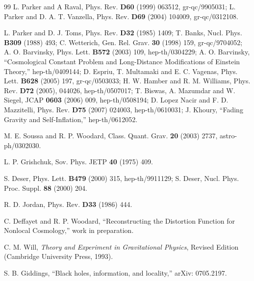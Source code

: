 \documentclass[12pt]{article}
\begin{document}
\begin{thebibliography}{99}
 L. Parker and A Raval, Phys. Rev. {\bf D60} (1999) 063512,
gr-qc/9905031; L. Parker and D. A. T. Vanzella, Phys. Rev. {\bf D69} (2004)
104009, gr-qc/0312108.

 L. Parker and D. J. Toms, Phys. Rev. {\bf D32} (1985) 1409;
T. Banks, Nucl. Phys. {\bf B309} (1988) 493;
C. Wetterich, Gen. Rel. Grav. {\bf 30} (1998) 159, gr-qc/9704052;
A. O. Barvinsky, Phys. Lett. {\bf B572} (2003) 109, hep-th/0304229;
A. O. Barvinsky, ``Cosmological Constant Problem and Long-Distance 
Modifications of Einstein Theory,'' hep-th/0409144;
D. Espriu, T. Multamaki and E. C. Vagenas, Phys. Lett. {\bf
B628} (2005) 197, gr-qc/0503033;
H. W. Hamber and R. M. Williams, Phys. Rev. {\bf D72} (2005),
044026, hep-th/0507017;
T. Biswas, A. Mazumdar and W. Siegel, JCAP {\bf 0603}
(2006) 009, hep-th/0508194;
D. Lopez Nacir and F. D. Mazzitelli, Phys. Rev. {\bf D75} (2007) 024003,
hep-th/0610031;
J. Khoury, ``Fading Gravity and Self-Inflation,''
hep-th/0612052.

 M. E. Soussa and R. P. Woodard, Class. Quant. Grav. {\bf 20}
(2003) 2737, astro-ph/0302030.

 L. P. Grishchuk, Sov. Phys. JETP {\bf 40} (1975) 409.

 S. Deser, Phys. Lett. {\bf B479} (2000) 315, hep-th/9911129;
S. Deser, Nucl. Phys. Proc. Suppl. {\bf 88} (2000) 204.

 R. D. Jordan, Phys. Rev. {\bf D33} (1986) 444.

 C. Deffayet and R. P. Woodard, ``Reconstructing the
Distortion Function for Nonlocal Cosmology,'' work in preparation.

 C. M. Will, {\it Theory and Experiment in Gravitational
Physics}, Revised Edition (Cambridge University Press, 1993).

 S. B. Giddings, ``Black holes, information, and locality,''
arXiv: 0705.2197.

\end{thebibliography}
\end{document}

